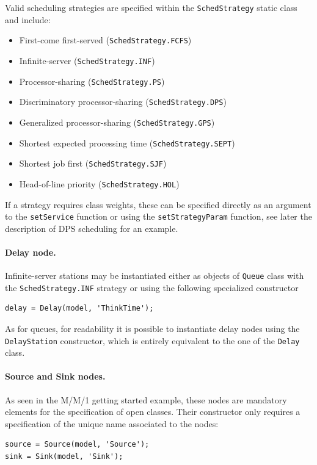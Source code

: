 Valid scheduling strategies are specified within the \texttt{SchedStrategy} static class and include:
\begin{itemize}
\item First-come first-served (\texttt{SchedStrategy.FCFS})
\item Infinite-server (\texttt{SchedStrategy.INF})
\item Processor-sharing (\texttt{SchedStrategy.PS})
\item Discriminatory processor-sharing (\texttt{SchedStrategy.DPS})
\item Generalized processor-sharing (\texttt{SchedStrategy.GPS})
\item Shortest expected processing time (\texttt{SchedStrategy.SEPT})
\item Shortest job first (\texttt{SchedStrategy.SJF})
\item Head-of-line priority (\texttt{SchedStrategy.HOL})
\end{itemize}
If a strategy requires class weights, these can be specified directly as an argument to the \texttt{setService} function or using the \texttt{setStrategyParam} function, see later the description of DPS scheduling for an example.

\paragraph{Delay node.} Infinite-server stations may be instantiated either as objects of \texttt{Queue} class with the \texttt{SchedStrategy.INF} strategy or using the following specialized constructor
\begin{lstlisting}
delay = Delay(model, 'ThinkTime');
\end{lstlisting}
As for queues, for readability it is possible to instantiate delay nodes using the \texttt{DelayStation} constructor, which is entirely equivalent to the one of the \texttt{Delay} class.

\paragraph{Source and Sink nodes.} As seen in the M/M/1 getting started example, these nodes are mandatory elements for the specification of open classes. Their constructor only requires a specification of the unique name associated to the nodes:
\begin{lstlisting}
source = Source(model, 'Source');
sink = Sink(model, 'Sink');
\end{lstlisting}

